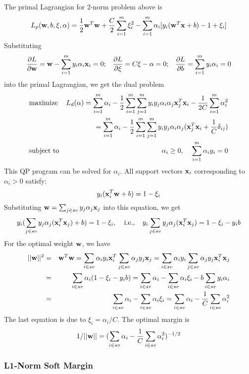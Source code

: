 The primal Lagrangian for 2-norm problem above is
\[	L_p({\bf w},b,\xi,\alpha)=\frac{1}{2}{\bf w}^T{\bf w}+\frac{C}{2}\sum_{i=1}^m\xi_i^2
	-\sum_{i=1}^m \alpha_i[y_i({\bf w}^T{\bf x}+b)-1+\xi_i]
\]
Substituting 
\[	\frac{\partial L}{\partial {\bf w}}={\bf w}-\sum_{i=1}^m y_i\alpha_i{\bf x}_i=0;
	\;\;\;
\frac{\partial L}{\partial \xi}=C\xi-\alpha=0;
	\;\;\;
\frac{\partial L}{\partial b}=\sum_{i=1}^m y_i\alpha_i=0	\]
into the primal Lagrangian, we get the dual problem 
\begin{eqnarray}
&	\mbox{maximize}	& L_d(\alpha)=\sum_{i=1}^m\alpha_i
	-\frac{1}{2}\sum_{i=1}^m\sum_{j=1}^m y_iy_j\alpha_i\alpha_j {\bf x}_j^T{\bf x}_i
	-\frac{1}{2C}\sum_{i=1}^m \alpha_i^2
	\nonumber \\
&&	=\sum_{i=1}^m\alpha_i
	-\frac{1}{2}\sum_{i=1}^m\sum_{j=1}^m y_iy_j\alpha_i\alpha_j({\bf x}_j^T{\bf x}_i
	+\frac{1}{C}\delta_{ij})
	\nonumber \\
&	\mbox{subject to}	& \alpha_i \ge 0,\;\;\;\;
	\sum_{i=1}^m \alpha_i y_i=0	\nonumber
\end{eqnarray}
This QP program can be solved for $\alpha_i$. All support vectors ${\bf x}_i$ 
corresponding to $\alpha_i > 0$ satisfy:
\[	y_i({\bf x}_i^T{\bf w}+b)=1-\xi_i	\]
Substituting ${\bf w}=\sum_{j\in sv} y_j\alpha_j{\bf x}_j$ into this equation, we get
\[	y_i(\sum_{j\in sv} y_j\alpha_j({\bf x}_i^T {\bf x}_j)+b)=1-\xi_i,
	\;\;\;\;\mbox{i.e.,}\;\;\;\;
	y_i\sum_{j\in sv} y_j\alpha_j({\bf x}_i^T {\bf x}_j)=1-\xi_i-y_ib	\]
For the optimal weight ${\bf w}$, we have
\begin{eqnarray}
||{\bf w}||^2&=&{\bf w}^T {\bf w}
	=\sum_{i\in sv} \alpha_i y_i {\bf x}^T_i \sum_{j\in sv} \alpha_j y_j {\bf x}_j
	=\sum_{i\in sv} \alpha_i y_i \sum_{j\in sv} \alpha_j y_j {\bf x}^T_i{\bf x}_j
	\nonumber \\
&=&	\sum_{i\in sv} \alpha_i (1-\xi_i-y_i b)
	=\sum_{i\in sv} \alpha_i-\sum_{i\in sv}\alpha_i \xi_i
	-b\sum_{i\in sv} y_i \alpha_i 	\nonumber \\
&=&	\sum_{i\in sv} \alpha_i-\sum_{i\in sv}\alpha_i \xi_i
	=\sum_{i\in sv} \alpha_i -\frac{1}{C}\sum_{i\in sv}\alpha_i^2
		\nonumber 
\end{eqnarray}	
The last equation is due to $\xi_i=\alpha_i/C$. The optimal margin is 
\[	1/||{\bf w}||=(\sum_{i\in sv} \alpha_i -\frac{1}{C}\sum_{i\in sv}\alpha_i^2)^{-1/2} \]

\subsubsection*{L1-Norm Soft Margin}

